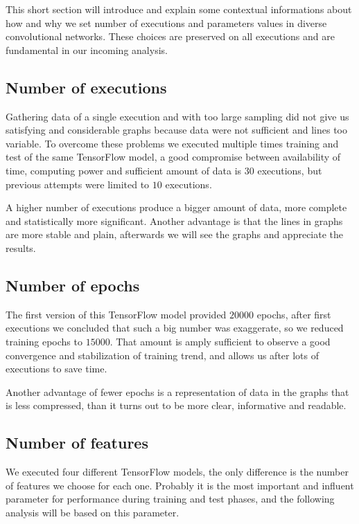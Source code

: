 This short section will introduce and explain some contextual informations about how and why we set number of executions and parameters values in diverse convolutional networks. These choices are preserved on all executions and are fundamental in our incoming analysis.

\subsection{Number of executions}

Gathering data of a single execution and with too large sampling did not give us satisfying and considerable graphs because data were not sufficient and lines too variable. To overcome these problems we executed multiple times training and test of the same TensorFlow model, a good compromise between availability of time, computing power and sufficient amount of data is $30$ executions, but previous attempts were limited to $10$ executions.

A higher number of executions produce a bigger amount of data, more complete and statistically more significant. Another advantage is that the lines in graphs are more stable and plain, afterwards we will see the graphs and appreciate the results.

\subsection{Number of epochs}

The first version of this TensorFlow model provided $20000$ epochs, after first executions we concluded that such a big number was exaggerate, so we reduced training epochs to $15000$. That amount is amply sufficient to observe a good convergence and stabilization of training trend, and allows us after lots of executions to save time.

Another advantage of fewer epochs is a representation of data in the graphs that is less compressed, than it turns out to be more clear, informative and readable.

\subsection{Number of features}

We executed four different TensorFlow models, the only difference is the number of features we choose for each one. Probably it is the most important and influent parameter for performance during training and test phases, and the following analysis will be based on this parameter.

